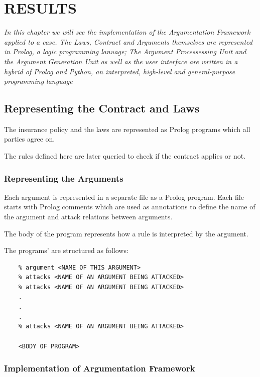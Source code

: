 \setlength{\footskip}{8mm}

\chapter{RESULTS}
\label{ch:results}

\textit{In this chapter we will see the implementation of the Argumentation Framework applied to a case. The Laws, Contract and Arguments themselves are represented in Prolog, a logic programming lanuage; The Argument Processessing Unit and the Argument Generation Unit as well as the user interface are written in a hybrid of Prolog and Python, an interpreted, high-level and general-purpose programming language }

\section{Representing the Contract and Laws}

The insurance policy and the laws are represented as Prolog programs which all parties agree on.

The rules defined here are later queried to check if the contract applies or not.

\subsection{Representing the Arguments}

Each argument is represented in a separate file as a Prolog program. Each file starts with Prolog comments which are used as annotations to define the name of the argument and attack relations between arguments.

The body of the program represents how a rule is interpreted by the argument.

The programs' are structured as follows:

\begin{verbatim}
    % argument <NAME OF THIS ARGUMENT>
    % attacks <NAME OF AN ARGUMENT BEING ATTACKED>
    % attacks <NAME OF AN ARGUMENT BEING ATTACKED>
    .
    .
    .
    % attacks <NAME OF AN ARGUMENT BEING ATTACKED>
    
    <BODY OF PROGRAM>
\end{verbatim}

\subsection{Implementation of Argumentation Framework}

